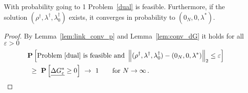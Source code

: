 \begin{theorem}
  \label{th:cons_dual}
  With probability going to 1 Problem~\ref{dual} is feasible.
  Furthermore, if the solution 
$
(\rho^\dagger,\lambda^\dagger,\lambda_0^\dagger)
$
exists,
it
converges in probability to 
$
(0_N,0,\lambda^*)
$.
\end{theorem}
\begin{proof}
  By Lemma~\ref{lem:link_conv_p} and Lemma~\ref{lem:conv_dG}
  it holds for all $\varepsilon>0$
  \begin{align*}
    &
    \P
    \left[ 
      \text{Problem~\ref{dual} is feasible and }
      \norm{
(\rho^\dagger,\lambda^\dagger,\lambda_0^\dagger)
-
(0_N,0,\lambda^*)
      }_2
      \le \varepsilon
    \right]
    \\
    &
    \ 
    \ge
    \ 
    \P
    \left[ \underline{\Delta G^*_\varepsilon}\ge 0 \right]
    \ 
    \to
    \ 
    1
    \qquad
    \text{for}\ 
    N\to\infty
    \,.
  \end{align*}
\end{proof}

